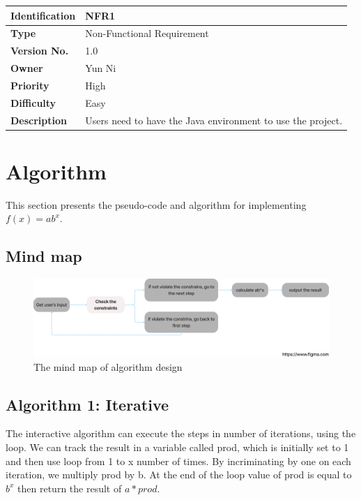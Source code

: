 \documentclass[11pt]{article}
\begin{document}
\begin{center}
    \begin{tabular}{|p{3cm}|p{11cm}| }
    \hline
    \textbf{Identification} &  NFR1 \\ \hline 
    \textbf{Type} & Non-Functional Requirement\\ \hline
    \textbf{Version No.} &  1.0 \\ \hline 
    \textbf{Owner} &  Yun Ni \\ \hline 
    \textbf{Priority} & High  \\ \hline
    \textbf{Difficulty} & Easy  \\ \hline
    \textbf{Description} & Users need to have the Java environment to use the project.\\ \hline
\end{tabular}
\end{center}

\section{Algorithm}\label{problem3}
This section presents the pseudo-code and algorithm for implementing $f(x)=ab^x$.
\subsection{Mind map}

\begin{figure}[h]
    \centering
    \includegraphics[width=13cm]{images/mindmap.jpeg}
    \caption{The mind map of algorithm design}
    \label{fig:mind}
\end{figure}

\subsection{Algorithm 1: Iterative}
The interactive algorithm can execute the steps in number of iterations, using the loop. We can track the result in a variable called prod, which is initially set to 1 and then use loop from 1 to x number of times. By incriminating by one on each iteration, we multiply prod by b. At the end of the loop value of prod is equal to $b^x$ then return the result of $a * prod$\cite{xu2015application}.
\end{document}
